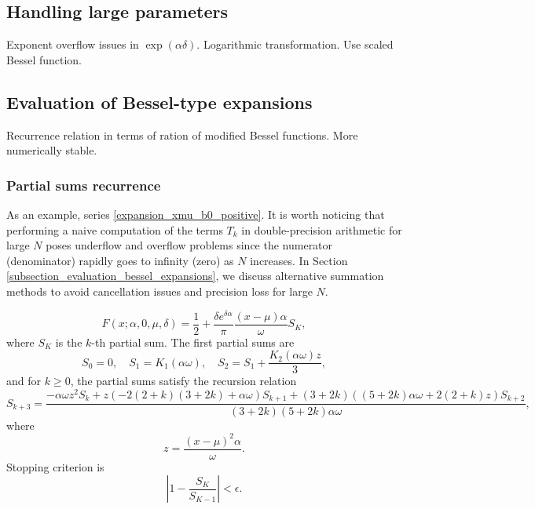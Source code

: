 \documentclass[10pt,a4paper,oneside]{article}
\numberwithin{equation}{section}
\begin{document}
\subsection{Handling large parameters}
Exponent overflow issues in $\exp(\alpha \delta)$. Logarithmic transformation. Use scaled Bessel function.
\subsection{Evaluation of Bessel-type expansions}
Recurrence relation in terms of ration of modified Bessel functions. More numerically stable.
\label{subsection_evaluation_bessel_expansions}

\subsubsection{Partial sums recurrence}
As an example, series \eqref{expansion_xmu_b0_positive}. It is worth noticing that performing a naive computation of the terms $T_k$ in double-precision arithmetic for large $N$ poses underflow and overflow problems since the numerator (denominator) rapidly goes to infinity (zero) as $N$ increases. In Section \ref{subsection_evaluation_bessel_expansions}, we discuss alternative summation methods to avoid cancellation issues and precision loss for large $N$.

\begin{equation}
F(x;\alpha, 0, \mu, \delta) = \frac{1}{2} + \frac{\delta e^{\delta \alpha}}{\pi}\frac{(x-\mu) \alpha}{\omega}S_K,
\end{equation}
where $S_K$ is the $k$-th partial sum. The first partial sums are
\begin{equation}
S_0 = 0, \quad S_1 = K_1(\alpha \omega), \quad S_2 = S_1 + \frac{K_2(\alpha \omega)z}{3},
\end{equation}
and for $k \ge 0$, the partial sums satisfy the recursion relation
\begin{equation}
S_{k+3} = \frac{-\alpha\omega z^2 S_k + z \left(-2 (2+k) (3 + 2k) + \alpha\omega\right) S_{k+1} + (3 + 2k) \left((5 + 2k) \alpha\omega + 2(2+k)z\right) S_{k+2}}{(3 + 2k) (5 + 2k) \alpha \omega},
\end{equation}
where
\begin{equation}
z = \frac{(x-\mu)^2 \alpha}{\omega}.
\end{equation}
Stopping criterion is
\begin{equation}
\left|1 - \frac{S_{K}}{S_{K-1}} \right| < \epsilon.
\end{equation}
\end{document}

